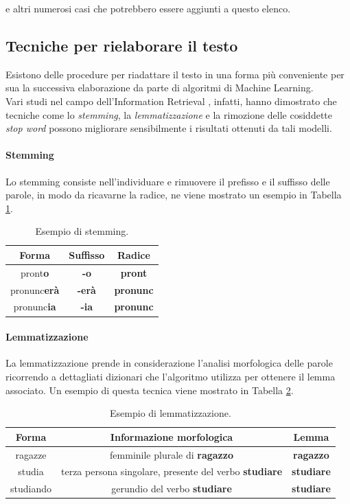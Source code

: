 \documentclass[12pt]{report}
\theoremstyle{definition}
\begin{document}
e altri numerosi casi che potrebbero essere aggiunti a questo elenco.
\subsection{Tecniche per rielaborare il testo}
Esistono delle procedure per riadattare il testo in una forma più conveniente per sua la successiva elaborazione da parte di algoritmi di Machine Learning.
\\
Vari studi nel campo dell'Information Retrieval \cite{22}, infatti, hanno dimostrato che tecniche come lo \textit{stemming}, la \textit{lemmatizzazione} e la rimozione delle cosiddette \textit{stop word} possono migliorare sensibilmente i risultati ottenuti da tali modelli.

\paragraph{Stemming} Lo stemming consiste nell'individuare e rimuovere il prefisso e il suffisso delle parole, in modo da ricavarne la radice, ne viene mostrato un esempio in Tabella \ref{stemming}.
\begin{table}[!h]
\centering
 \begin{tabular}{|c|c|c|} 
 \hline 
 \textbf{Forma} & \textbf{Suffisso} & \textbf{Radice}
\\ [0.5ex] 
\hline
pront\textbf{o} & \textbf{-o} & \textbf{pront} \\
pronunc\textbf{erà} & \textbf{-erà} & \textbf{pronunc} \\
pronunc\textbf{ia} & \textbf{-ia} & \textbf{pronunc} \\
 \hline
\end{tabular}
\caption{Esempio di stemming.}
\label{stemming}
\end{table}

\paragraph{Lemmatizzazione} La lemmatizzazione prende in considerazione l'analisi morfologica delle parole ricorrendo a dettagliati dizionari che l'algoritmo utilizza per ottenere il lemma associato.
Un esempio di questa tecnica viene mostrato in Tabella \ref{lemmatization}.
\begin{table}[!h]
\centering
 \begin{tabular}{|c|c|c|} 
 \hline 
 \textbf{Forma} & \textbf{Informazione morfologica} & \textbf{Lemma}
\\ [0.5ex] 
\hline
ragazze & femminile plurale di \textbf{ragazzo} & \textbf{ragazzo} \\
studia & terza persona singolare, presente del verbo \textbf{studiare} & \textbf{studiare} \\
studiando & gerundio del verbo \textbf{studiare} & \textbf{studiare} \\
 \hline
\end{tabular}
\caption{Esempio di lemmatizzazione.}
\label{lemmatization}
\end{table}
\end{document}
